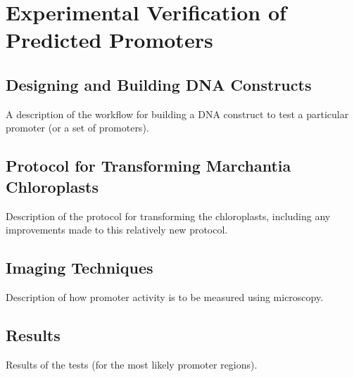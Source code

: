 
\chapter{Experimental Verification of Predicted Promoters}
\label{chap:ExperimentalVerification} 

\section{Designing and Building DNA Constructs}

A description of the workflow for building a DNA construct to test a particular
promoter (or a set of promoters).

\section{Protocol for Transforming Marchantia Chloroplasts}

Description of the protocol for transforming the chloroplasts, including any
improvements made to this relatively new protocol.

\section{Imaging Techniques}

Description of how promoter activity is to be measured using microscopy.

\section{Results}

Results of the tests (for the most likely promoter regions).

